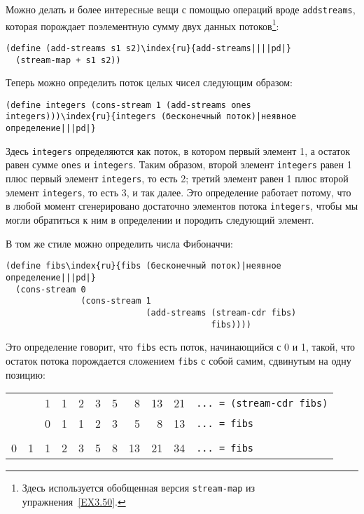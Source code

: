 Можно делать и более интересные вещи с помощью операций
вроде {\tt add\-streams}, которая порождает поэлементную сумму
двух данных потоков\footnote{Здесь используется обобщенная версия
{\tt stream-map} из упражнения~\ref{EX3.50}.
}:

\begin{Verbatim}[fontsize=\small]
(define (add-streams s1 s2)\index{ru}{add-streams||||pd|}
  (stream-map + s1 s2))
\end{Verbatim}
Теперь можно определить поток целых чисел следующим образом:

\begin{Verbatim}[fontsize=\small]
(define integers (cons-stream 1 (add-streams ones integers)))\index{ru}{integers (бесконечный поток)|неявное определение|||pd|}
\end{Verbatim}
Здесь {\tt integers} определяются как поток, в котором первый
элемент 1, а остаток равен сумме {\tt ones} и
{\tt integers}. Таким образом, второй элемент
{\tt integers} равен 1 плюс первый элемент
{\tt integers}, то есть 2; третий элемент равен 1 плюс второй
элемент {\tt integers}, то есть 3, и так далее.  Это
определение работает потому, что в любой момент сгенерировано
достаточно элементов потока {\tt integers}, чтобы мы могли
обратиться к ним в определении и породить следующий элемент.

В том же стиле можно определить числа Фибоначчи:

\begin{Verbatim}[fontsize=\small]
(define fibs\index{ru}{fibs (бесконечный поток)|неявное определение|||pd|}
  (cons-stream 0
               (cons-stream 1
                            (add-streams (stream-cdr fibs)
                                         fibs))))
\end{Verbatim}
Это определение говорит, что {\tt fibs} есть поток, начинающийся
с 0 и 1, такой, что остаток потока порождается сложением
{\tt fibs} с собой самим, сдвинутым на одну позицию:

\medskip

\begin{tabular}{rrrrrrrrrrl}
   &   & 1 & 1 & 2 & 3 & 5 &  8 & 13 & 21 & \texttt{... = (stream-cdr fibs)}\\
   &   & 0 & 1 & 1 & 2 & 3 &  5 &  8 & 13 & \texttt{... = fibs}\\
\hline\\
 0 & 1 & 1 & 2 & 3 & 5 & 8 & 13 & 21 & 34 & \texttt{... = fibs}\\
\end{tabular}
\medskip%

